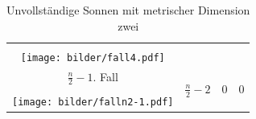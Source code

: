 \begin{table}[htp]
\begin{tabular}{|c|c|c|c|}
\cline{1-1}
\vspace{-6mm}&&&\\
\texttt{[image: bilder/fall4.pdf]}&&&\\
\hline\hline
\vspace{0.3mm}
$\frac{n}{2}-1$. Fall&\multirow{3}{20mm}{$\frac{n}{2}-2$}&\multirow{3}{20mm}{0}&\multirow{3}{20mm}{0}\\
\cline{1-1}
\vspace{-6mm}&&&\\
\texttt{[image: bilder/falln2-1.pdf]}&&&\\
\hline
\end{tabular}
\caption{Unvollständige Sonnen mit metrischer Dimension zwei}
\label{fallunterscheidungungeradesonnen2md}
\end{table}
%
\newpage
